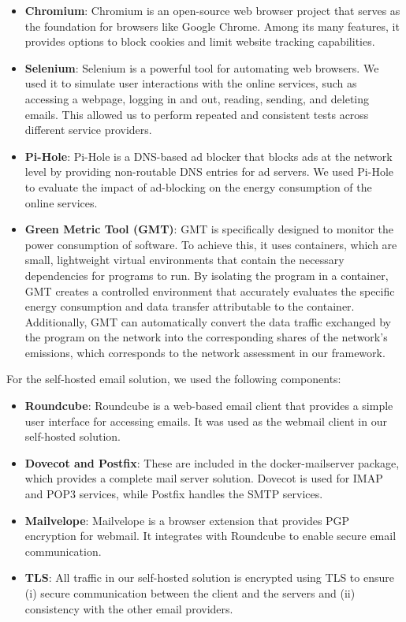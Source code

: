 \documentclass[sigconf,9pt,usenames,dvipsnames,table]{acmart}
\begin{document}
\begin{itemize}
  \item \textbf{Chromium}: Chromium is an open-source web browser project that serves as the foundation for browsers like Google Chrome. Among its many features, it provides options to block cookies and limit website tracking capabilities.
  \item \textbf{Selenium}: Selenium is a powerful tool for automating web browsers. We used it to simulate user interactions with the online services, such as accessing a webpage, logging in and out, reading, sending, and deleting emails. This allowed us to perform repeated and consistent tests across different service providers.
  \item \textbf{Pi-Hole}: Pi-Hole is a DNS-based ad blocker that blocks ads at the network level by providing non-routable DNS entries for ad servers. We used Pi-Hole to evaluate the impact of ad-blocking on the energy consumption of the online services.
  \item \textbf{Green Metric Tool (GMT)}: GMT is specifically designed to monitor the power consumption of software. To achieve this, it uses containers, which are small, lightweight virtual environments that contain the necessary dependencies for programs to run. By isolating the program in a container, GMT creates a controlled environment that accurately evaluates the specific energy consumption and data transfer attributable to the container. Additionally, GMT can automatically convert the data traffic exchanged by the program on the network into the corresponding shares of the network's emissions, which corresponds to the network assessment in our framework.
\end{itemize}
For the self-hosted email solution, we used the following components:
\begin{itemize}
  \item \textbf{Roundcube}: Roundcube is a web-based email client that provides a simple user interface for accessing emails. It was used as the webmail client in our self-hosted solution.
  \item \textbf{Dovecot and Postfix}: These are included in the docker-mailserver package, which provides a complete mail server solution. Dovecot is used for IMAP and POP3 services, while Postfix handles the SMTP services.
  \item \textbf{Mailvelope}: Mailvelope is a browser extension that provides PGP encryption for webmail. It integrates with Roundcube to enable secure email communication.
  \item \textbf{TLS}: All traffic in our self-hosted solution is encrypted using TLS to ensure (i) secure communication between the client and the servers and (ii) consistency with the other email providers.
\end{itemize}
\end{document}
